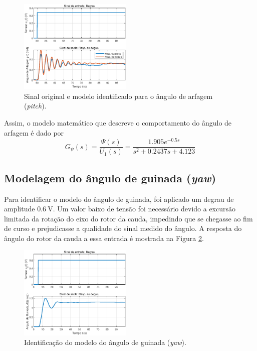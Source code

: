 \begin{figure}[H]
    \centering
    \includegraphics[width=0.48\textwidth]{figures/Identificacao/IdentificaPitchFinal.eps}
    \caption{Sinal original e modelo identificado para o ângulo de arfagem (\textit{pitch}).}
    \label{fig:IdentificacaoPitchAngleDesloc}
\end{figure}

Assim, o modelo matemático que descreve o comportamento do ângulo de arfagem é dado por
\begin{equation}\label{eq:FTModeloIDPitch}
    G_{\psi}(s) = \frac{\Psi(s)}{U_{1}(s)} = \frac{1.905 e^{-0.5 s}}{s^2 + 0.2437 s + 4.123}
\end{equation}

\subsection{\textbf{Modelagem do ângulo de guinada (\textit{yaw})}}

Para identificar o modelo do ângulo de guinada, foi aplicado um degrau de amplitude $\SI{0.6}{\volt}$. Um valor baixo de tensão foi necessário devido a excursão limitada da rotação do eixo do rotor da cauda, impedindo que se chegasse ao fim de curso e prejudicasse a qualidade do sinal medido do ângulo. A resposta do ângulo do rotor da cauda a essa entrada é mostrada na Figura \ref{fig:IdentificacaoYawAngleInicial}.

\begin{figure}[H]
    \centering
    \includegraphics[width=0.48\textwidth]{figures/Identificacao/IdentificaYawInicial.eps}
    \caption{Identificação do modelo do ângulo de guinada (\textit{yaw}).}
    \label{fig:IdentificacaoYawAngleInicial}
\end{figure}

